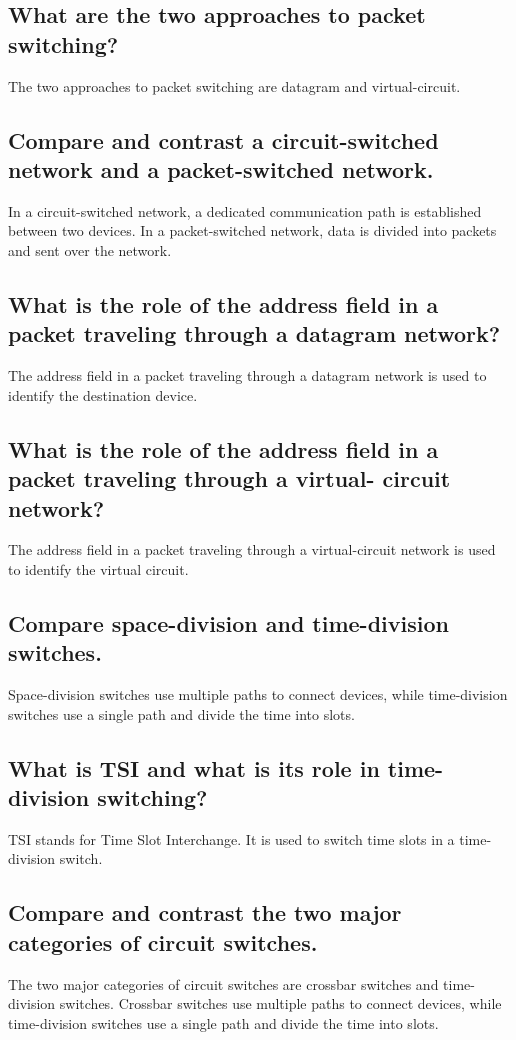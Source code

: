 \documentclass{article}
\begin{document}
\subsection{
	What are the two approaches to packet switching?
}
The two approaches to packet switching are datagram and virtual-circuit.
\subsection{
	Compare and contrast a circuit-switched network and a packet-switched network.
}
In a circuit-switched network, a dedicated communication path is established between two devices. In a packet-switched network, data is divided into packets and sent over the network.
\subsection{
	What is the role of the address field in a packet traveling through a datagram
	network?
}
The address field in a packet traveling through a datagram network is used to identify the destination device.
\subsection{
	What is the role of the address field in a packet traveling through a virtual-
	circuit network?
}
The address field in a packet traveling through a virtual-circuit network is used to identify the virtual circuit.
\subsection{
	Compare space-division and time-division switches.
}
Space-division switches use multiple paths to connect devices, while time-division switches use a single path and divide the time into slots.
\subsection{
	What is TSI and what is its role in time-division switching?
}
TSI stands for Time Slot Interchange. It is used to switch time slots in a time-division switch.
\subsection{
	Compare and contrast the two major categories of circuit switches.
}
The two major categories of circuit switches are crossbar switches and time-division switches. Crossbar switches use multiple paths to connect devices, while time-division switches use a single path and divide the time into slots.
\end{document}
